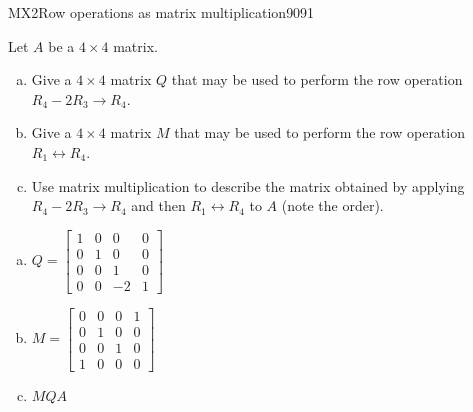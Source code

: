 \begin{exercise}{MX2}{Row operations as matrix multiplication}{9091} 
\begin{exerciseStatement} 

Let \(A\) be a \(4 \times 4\) matrix.

 

\begin{enumerate}[(a)]
\item Give a \(4 \times 4\) matrix \(Q\) that may be used to perform the row operation \(R_4 - 2 R_3 \to R_4\).
\item Give a \(4 \times 4\) matrix \(M\) that may be used to perform the row operation \(R_1 \leftrightarrow R_4\).
\item Use matrix multiplication to describe the matrix obtained by applying \(R_4 - 2 R_3 \to R_4\) and then \(R_1 \leftrightarrow R_4\) to \(A\) (note the order). 
\end{enumerate}

     \end{exerciseStatement}
 \begin{exerciseAnswer} 

\begin{enumerate}[(a)]
\item \(Q=\left[\begin{array}{cccc}
1 & 0 & 0 & 0 \\
0 & 1 & 0 & 0 \\
0 & 0 & 1 & 0 \\
0 & 0 & -2 & 1
\end{array}\right]\)
\item \(M=\left[\begin{array}{cccc}
0 & 0 & 0 & 1 \\
0 & 1 & 0 & 0 \\
0 & 0 & 1 & 0 \\
1 & 0 & 0 & 0
\end{array}\right]\)
\item  \(MQA\) 
\end{enumerate}

     \end{exerciseAnswer}
 \end{exercise}


